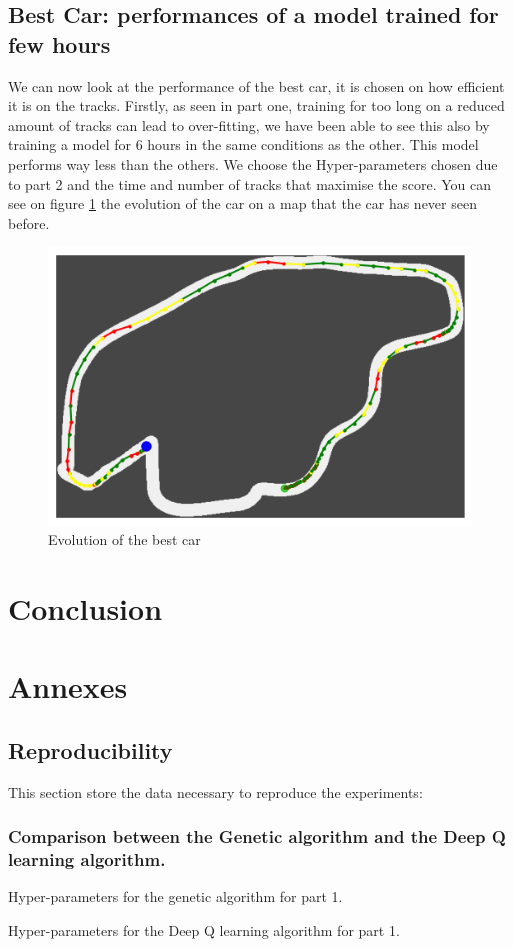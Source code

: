 \documentclass[11pt,a4paper]{article}
\newcounter{fig}
\begin{document}
		\subsection*{Best Car: performances of a model trained for few hours }
        We can now look at the performance of the best car, it is chosen on how efficient it is on the tracks. Firstly, as seen in part one, training for too long on a reduced amount of tracks can lead to over-fitting, we have been able to see this also by training a model for $6$ hours in the same conditions as the other. This model performs way less than the others. We choose the Hyper-parameters chosen due to part 2 and the time and number of tracks that maximise the score. You can see on figure \ref{figure:Evolution of best car} the evolution of the car on a map that the car has never seen before. 
        \begin{figure}[h]
            \centering
            \includegraphics[width=0.5\linewidth]{image.png}
            \caption{Evolution of the best car}
            \label{figure:Evolution of best car}
        \end{figure}
    
    
    \section*{Conclusion}

\newpage
\section*{Annexes}
\subsection*{Reproducibility}
This section store the data necessary to reproduce the experiments: \subsubsection*{Comparison between the Genetic algorithm and the Deep Q learning algorithm.}
Hyper-parameters for the genetic algorithm for part 1.
\begin{mybox}
    \tiny{
}
\end{mybox}
\label{Hyperparameters}
Hyper-parameters for the Deep Q learning algorithm for part 1.
\begin{mybox}
    \tiny{
}
\end{mybox}
\end{document}
